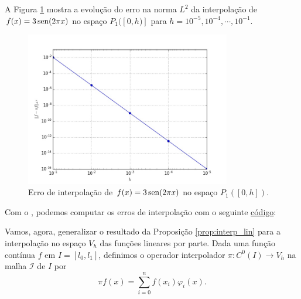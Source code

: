 \begin{ex}\label{ex:esterro_interp_lin}
  A Figura \ref{fig:ex_esterro_interp_lin} mostra a evolução do erro na norma $L^2$ da interpolação de $f(x)=3\operatorname{sen}(2\pi x)$ no espaço $P_1([0, h)]$ para $h=10^{-5}, 10^{-4}, \cdots, 10^{-1}$.

  \begin{figure}[h!]
    \centering
    \includegraphics[width=0.8\textwidth]{./cap_mef1d/dados/ex_esterro_interp_lin/ex_esterro_interp_lin}
    \caption{Erro de interpolação de $f(x)=3\operatorname{sen}(2\pi x)$ no espaço $P_1([0, h])$.}
    \label{fig:ex_esterro_interp_lin}
  \end{figure}

\ifispython
Com o \fenics, podemos computar os erros de interpolação com o seguinte \href{https://github.com/phkonzen/notas/blob/master/src/MetodoElementosFinitos/cap_mef1d/dados/ex_esterro_interp_lin/ex_esterro_interp_lin.py}{código}:

\fi
\end{ex}


Vamos, agora, generalizar o resultado da Proposição \ref{prop:interp_lin} para a interpolação no espaço $V_h$ das funções lineares por parte. Dada uma função contínua $f$ em $I = [l_0, l_1]$, definimos o operador interpolador $\pi: C^0(I)\to V_h$ na malha $\mathcal{I}$ de $I$ por
\begin{equation}
  \pi f(x) = \sum_{i=0}^{n}f(x_i)\varphi_i(x).
\end{equation}

